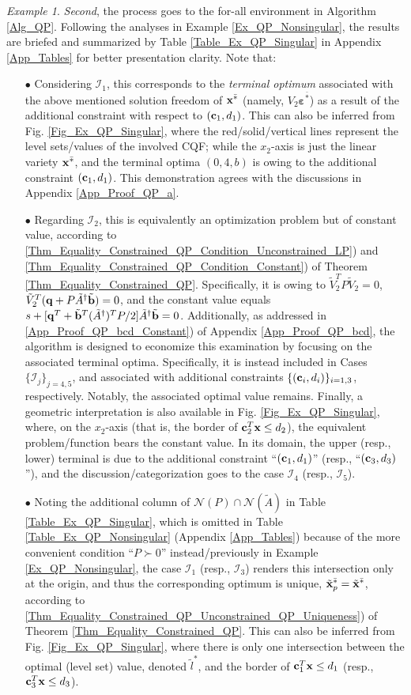 \documentclass[9pt,twocolumn,twoside,lineno]{pnas-new-1}
\newcommand{\bfb}{{\bf b}}
\newcommand{\bfc}{{\bf c}}
\newcommand{\bfx}{{\bf x}}
\newcommand{\bfq}{{\bf q}}
\newcommand{\bfvarepsilon}{{\boldsymbol \varepsilon}}
\newcommand{\calI}{{\mathcal I}}
\newcommand{\calN}{{\mathcal N}}
\theoremstyle{remark}
\newtheorem{example}{Example}[section]
\begin{document}
\begin{example}
\textit{Second}, the process goes to the for-all environment in Algorithm \ref{Alg_QP}. Following the analyses in Example \ref{Ex_QP_Nonsingular}, the results are briefed and summarized by Table \ref{Table_Ex_QP_Singular} in Appendix \ref{App_Tables} for better presentation clarity. Note that:
\begin{enumerate}
\item[$\bullet$] Considering $\calI_1$, this corresponds to the \textit{terminal optimum} associated with the above mentioned solution freedom of $\bfx^{\bar *}$ (namely, $V_2\bfvarepsilon^{\bar *}$) as a result of the additional constraint with respect to $(\bfc_1,d_1)$. This can also be inferred from Fig. \ref{Fig_Ex_QP_Singular}, where the red/solid/vertical lines represent the level sets/values of the involved CQF; while the $x_2$-axis is just the linear variety $\bfx^{\bar *}$, and the terminal optima $(0,4,b)$ is owing to the additional constraint $(\bfc_1,d_1)$. This demonstration agrees with the discussions in Appendix \ref{App_Proof_QP_a}.
\item[$\bullet$] Regarding $\calI_2$, this is equivalently an optimization problem but of constant value, according to \ref{Thm_Equality_Constrained_QP_Condition_Unconstrained_LP}) and \ref{Thm_Equality_Constrained_QP_Condition_Constant}) of Theorem \ref{Thm_Equality_Constrained_QP}. Specifically, it is owing to $\tilde V_2^TP\tilde V_2=0$, $\tilde V_2^T(\bfq+P\tilde A^\dagger\tilde \bfb)=0$, and the constant value equals $s+[\bfq^T+\tilde\bfb^T(\tilde A^\dagger)^TP/2]\tilde A^\dagger\tilde\bfb=0$. Additionally, as addressed in \ref{App_Proof_QP_bcd_Constant}) of Appendix \ref{App_Proof_QP_bcd}, the algorithm is designed to economize this examination by focusing on the associated terminal optima. Specifically, it is instead included in Cases $\{\calI_j\}_{j=4,5}$, and associated with additional constraints $\{(\bfc_i,d_i)\}_{i=1,3}$, respectively. Notably, the associated optimal value remains. Finally, a geometric interpretation is also available in Fig. \ref{Fig_Ex_QP_Singular}, where, on the $x_2$-axis (that is, the border of $\bfc_2^T\bfx\le d_2$), the equivalent problem/function bears the constant value. In its domain, the upper (resp., lower) terminal is due to the additional constraint ``$(\bfc_1,d_1)$'' (resp., ``$(\bfc_3,d_3)$''), and the discussion/categorization goes to the case $\calI_4$ (resp., $\calI_5$).
\item[$\bullet$] Noting the additional column of $\calN(P)\cap\calN(\tilde A)$ in Table \ref{Table_Ex_QP_Singular}, which is omitted in Table \ref{Table_Ex_QP_Nonsingular} (Appendix \ref{App_Tables}) because of the more convenient condition ``$P\succ 0$'' instead/previously in Example \ref{Ex_QP_Nonsingular}, the case $\calI_1$ (resp., $\calI_3$) renders this intersection only at the origin, and thus the corresponding optimum is unique, $\tilde\bfx_p^{\bar *}=\tilde\bfx^{\bar *}$, according to \ref{Thm_Equality_Constrained_QP_Unconstrained_QP_Uniqueness}) of Theorem \ref{Thm_Equality_Constrained_QP}. This can also be inferred from Fig. \ref{Fig_Ex_QP_Singular}, where there is only one intersection between the optimal (level set) value, denoted $\tilde l^*$, and the border of $\bfc_1^T\bfx\le d_1$ (resp., $\bfc_3^T\bfx\le d_3$).

\end{enumerate}
\end{example}
\end{document}
